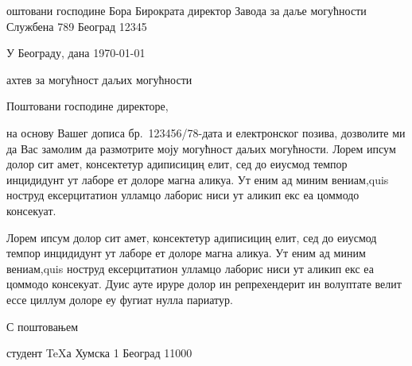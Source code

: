 
\fontfam[DejaVu]
\srclang

\address
  Поштовани господине
  Бора Бирократа
  директор Завода за даље могућности
  Службена 789
  Београд 12345

\hfill У Београду, дана \today

\subject Захтев за могућност даљих могућности

Поштовани господине директоре,

на основу Вашег дописа бр.~123456/78-дата и електронског позива, дозволите ми 
да Вас замолим да размотрите моју могућност даљих могућности.
Лорем ипсум долор сит амет, консектетур адиписициң елит, сед до
еиусмод темпор инцидидунт ут лаборе ет долоре магна аликуа. Ут еним ад миним
вениам,quis ноструд ексерцитатион улламцо лаборис ниси ут аликип екс еа
цоммодо консекуат.

Лорем ипсум долор сит амет, консектетур адиписициң елит, сед до
еиусмод темпор инцидидунт ут лаборе ет долоре магна аликуа. Ут еним ад миним
вениам,quis ноструд ексерцитатион улламцо лаборис ниси ут аликип екс еа
цоммодо консекуат. Дуис ауте ируре долор ин репрехендерит ин волуптате велит
ессе циллум долоре еу фугиат нулла париатур.

С поштовањем

\hfill \address
  {\it Вук Ђукановић}
  студент \TeX а
  Хумска 1
  Београд 11000

\bye
